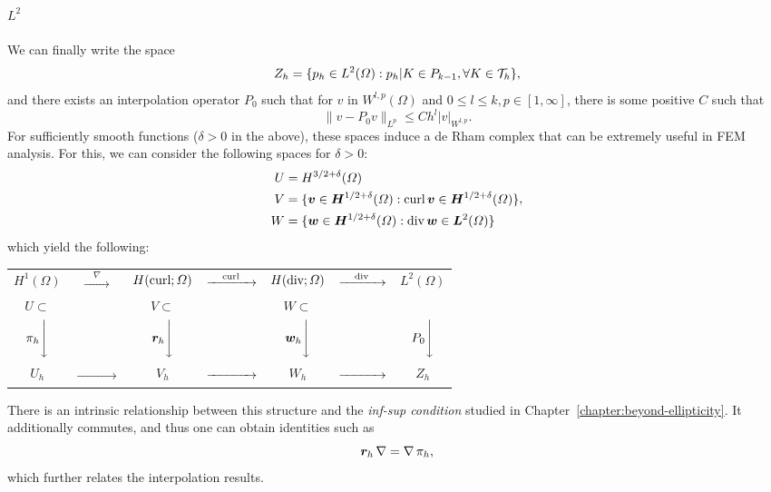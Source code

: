 \paragraph{$L^2$} We can finally write the space 
\begin{equation}
    Z_h = \{ p_h \in L^2(\Omega): p_h|K \in P_{k-1}, \forall K\in \mathcal{T}_h\},
\end{equation}
and there exists an interpolation operator $P_0$ such that for $v$ in $W^{l,p}(\Omega)$ and $0\leq l \leq k, p\in[1,\infty]$, there is some positive $C$ such that
\begin{equation}
    \| v - P_0v\|_{L^p} \leq C h^l |v|_{W^{l,p}}.
\end{equation}
For sufficiently smooth functions ($\delta>0$ in the above), these spaces induce a de Rham complex that can be extremely useful in FEM analysis. For this, we can consider the following spaces for $\delta > 0$: 
\begin{equation}
    \begin{aligned}
        U &= H^{3/2+\delta}(\Omega) \\
        V &= \{\vec v \in \vec H^{1/2+\delta}(\Omega) : \curl \vec v \in \vec H^{1/2+\delta}(\Omega)\} \\
        W &= \{ \vec w \in \vec H^{1/2+\delta}(\Omega): \dive \vec w \in \vec L^2(\Omega) \}
    \end{aligned},
\end{equation}
which yield the following: 
\begin{center} 
    \begin{tabular}{ccccccc}
    $H^1(\Omega)$ & $\xrightarrow{\quad\nabla\quad}$& $H(\operatorname{\text{curl}};\Omega)$ & $\xrightarrow{\quad\operatorname{\text{curl}}\quad}$ & $H(\operatorname{\text{div}};\Omega)$ & $\xrightarrow{\quad\operatorname{\text{div}}\quad} $ & $L^2(\Omega)$ \\
    $U\subset$ & & $V\subset$ & & $W \subset$ & &  \\
    $\pi_h \Bigg\downarrow$ && $\vec r_h \Bigg\downarrow$ && $\vec w_h\Bigg\downarrow$ && $P_0 \Bigg\downarrow$ \\
    $U_h$ & $\xrightarrow{\quad\phantom{nabla}\quad}$& $V_h$ & $\xrightarrow{\quad\phantom{\curl}\quad}$ & $W_h$ & $\xrightarrow{\quad\phantom{\dive}\quad} $ & $Z_h$ \\
    \end{tabular}
\end{center} 
There is an intrinsic relationship between this structure and the \emph{inf-sup condition} studied in Chapter~\ref{chapter:beyond-ellipticity}. It additionally commutes, and thus one can obtain identities such as 
\begin{equation*}
\vec r_h \grad = \grad \pi_h,
\end{equation*}
which further relates the interpolation results. 

